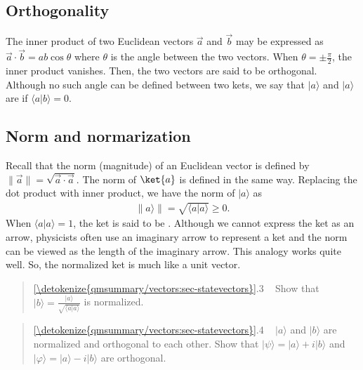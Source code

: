 \documentclass[letterpaper,10pt,english]{jupyterBook}
\begin{document}
\subsection{Orthogonality}
\label{\detokenize{qmsummary/vectors:orthogonality}}
\sphinxAtStartPar
The inner product of two Euclidean vectors \(\vec{a}\) and \(\vec{b}\) may be expressed as \(\vec{a}\cdot\vec{b} = a b \cos\theta\) where \(\theta\) is the angle between the two vectors. When \(\theta = \pm \frac{\pi}{2}\), the inner product vanishes.  Then, the two vectors are said to be orthogonal. Although no such angle can be defined between two kets, we say that \(|a\rangle\) and \(|a\rangle\) are  if \(\langle a | b \rangle = 0\).


\subsection{Norm and normarization}
\label{\detokenize{qmsummary/vectors:norm-and-normarization}}
\sphinxAtStartPar
Recall that the norm (magnitude) of an Euclidean vector is defined by \(\|\vec{a}\| = \sqrt{\vec{a}\cdot\vec{a}}\).
The norm of \(\ket{a}\) is defined in the same way.  Replacing the dot product with inner product, we have the norm of \(|a\rangle\) as
\begin{equation*}
\begin{split}
\|a\rangle\| = \sqrt{\langle a|a \rangle}  \ge 0.
\end{split}
\end{equation*}
\sphinxAtStartPar
When \(\langle a|a \rangle = 1\), the ket is said to be .  Although we cannot express the ket as an arrow, physicists often use an imaginary arrow to represent a ket and the norm can be viewed as the length of the imaginary arrow.  This analogy works quite well.  So, the normalized ket is much like a unit vector.
\begin{quote}

\sphinxAtStartPar
{} \hyperref[\detokenize{qmsummary/vectors:sec-statevectors}]{\ref{\detokenize{qmsummary/vectors:sec-statevectors}}}.3    Show that \(|b\rangle = \frac{|a\rangle}{\sqrt{\langle a|a \rangle}}\) is normalized.
\end{quote}
\begin{quote}

\sphinxAtStartPar
{} \hyperref[\detokenize{qmsummary/vectors:sec-statevectors}]{\ref{\detokenize{qmsummary/vectors:sec-statevectors}}}.4     \(|a\rangle\) and \(|b\rangle\) are normalized and orthogonal to each other. Show that \(|\psi\rangle = |a\rangle + i |b \rangle\) and \(|\varphi\rangle = |a\rangle - i |b \rangle\) are orthogonal.
\end{quote}
\end{document}
